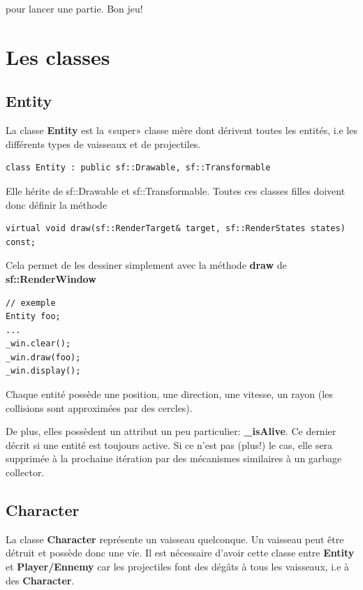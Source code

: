 \documentclass{article}
\begin{document}
pour lancer une partie. Bon jeu!

\section{Les classes}


\subsection{Entity}

La classe \textbf{Entity} est la «super» classe mère dont dérivent toutes les entités, i.e les différents types de vaisseaux et de projectiles.

\begin{verbatim} 
class Entity : public sf::Drawable, sf::Transformable
\end{verbatim}

Elle hérite de sf::Drawable et sf::Transformable. Toutes ces classes filles doivent donc définir la méthode

\begin{verbatim} 
virtual void draw(sf::RenderTarget& target, sf::RenderStates states) const;
\end{verbatim}

Cela permet de les dessiner simplement avec la méthode \textbf{draw} de \textbf{sf::RenderWindow}

\begin{verbatim}
// exemple
Entity foo;
...
_win.clear();
_win.draw(foo);
_win.display();
\end{verbatim}

Chaque entité possède une position, une direction, une vitesse, un rayon (les collisions sont approximées par des cercles).

De plus, elles possèdent un attribut un peu particulier: \textbf{\_isAlive}. Ce dernier décrit si une entité est toujours active. Si ce n'est pas (plus!) le cas, elle sera supprimée à la prochaine itération par des mécanismes similaires à un garbage collector.

\subsection{Character}

La classe \textbf{Character} représente un vaisseau quelconque. Un vaisseau peut être détruit et possède donc une vie. Il est nécessaire d'avoir cette classe entre \textbf{Entity} et \textbf{Player/Ennemy} car les projectiles font des dégâts à tous les vaisseaux, i.e à des \textbf{Character}.
\end{document}
